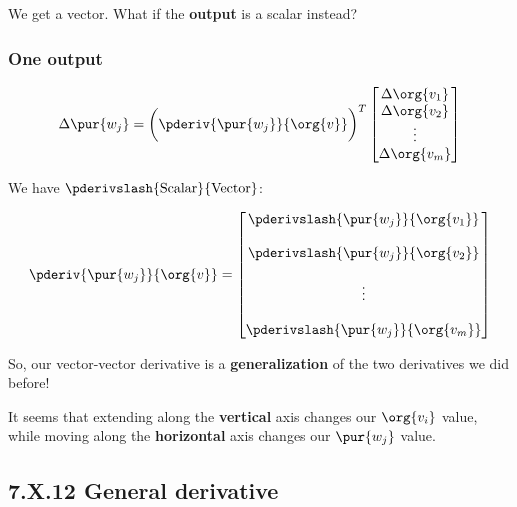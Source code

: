             We get a vector. What if the \textbf{output} is a scalar instead?
        
        \subsubsection*{One output}
        
            \begin{equation}
                \Delta \pur{w_j}
                =
                \bigg(
                    \pderiv{ \pur{w_j} }{ \org{v} } 
                \bigg)^T
                \begin{bmatrix}
                    \Delta \org{v_1}\\ \Delta \org{v_2}\\ \vdots \\ \Delta \org{v_m}
                \end{bmatrix}
            \end{equation}
            
            We have $\pderivslash{ \text{Scalar} }{ \text{Vector} }$:
            
            \begin{equation}
                \pderiv{ \pur{w_j} }{ \org{v} } 
                =
                \begin{bmatrix}
                    \pderivslash{ \pur{w_j} }   { \org{v_1} }\\\\
                    \pderivslash{ \pur{w_j} }   { \org{v_2} }\\\\
                    \vdots \\\\
                    \pderivslash{ \pur{w_j} }   { \org{v_m} }
                \end{bmatrix}
            \end{equation}
            
            So, our vector-vector derivative is a \textbf{generalization} of the two derivatives we did before! 
            
            It seems that extending along the \textbf{vertical} axis changes our $\org{v_i}$ value, while moving along the \textbf{horizontal} axis changes our $\pur{w_j}$ value.
         
    \secdiv
    
    \subsection*{7.X.12 \quad General derivative}  
        
